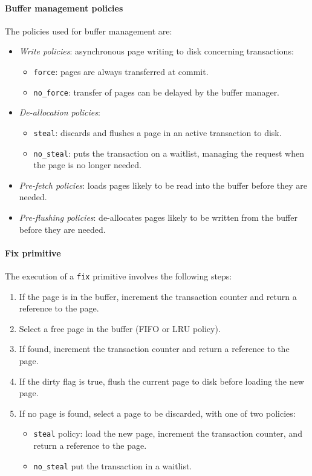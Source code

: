 \paragraph*{Buffer management policies}
The policies used for buffer management are: 
\begin{itemize}
    \item \textit{Write policies}: asynchronous page writing to disk concerning transactions:
        \begin{itemize}
            \item \texttt{force}: pages are always transferred at commit.
            \item \texttt{no\_force}: transfer of pages can be delayed by the buffer manager.
        \end{itemize}
    \item \textit{De-allocation policies}:
        \begin{itemize}
            \item \texttt{steal}: discards and flushes a page in an active transaction to disk.
            \item \texttt{no\_steal}: puts the transaction on a waitlist, managing the request when the page is no longer needed.
        \end{itemize}
    \item \textit{Pre-fetch policies}: loads pages likely to be read into the buffer before they are needed.
    \item \textit{Pre-flushing policies}: de-allocates pages likely to be written from the buffer before they are needed.
\end{itemize}

\paragraph*{Fix primitive}
The execution of a \texttt{fix} primitive involves the following steps:
\begin{enumerate}
    \item If the page is in the buffer, increment the transaction counter and return a reference to the page.
    \item Select a free page in the buffer (FIFO or LRU policy).
    \item If found, increment the transaction counter and return a reference to the page.
    \item If the dirty flag is true, flush the current page to disk before loading the new page.
    \item If no page is found, select a page to be discarded, with one of two policies:
        \begin{itemize}
            \item \texttt{steal} policy: load the new page, increment the transaction counter, and return a reference to the page.
            \item \texttt{no\_steal} put the transaction in a waitlist.
        \end{itemize}
\end{enumerate}